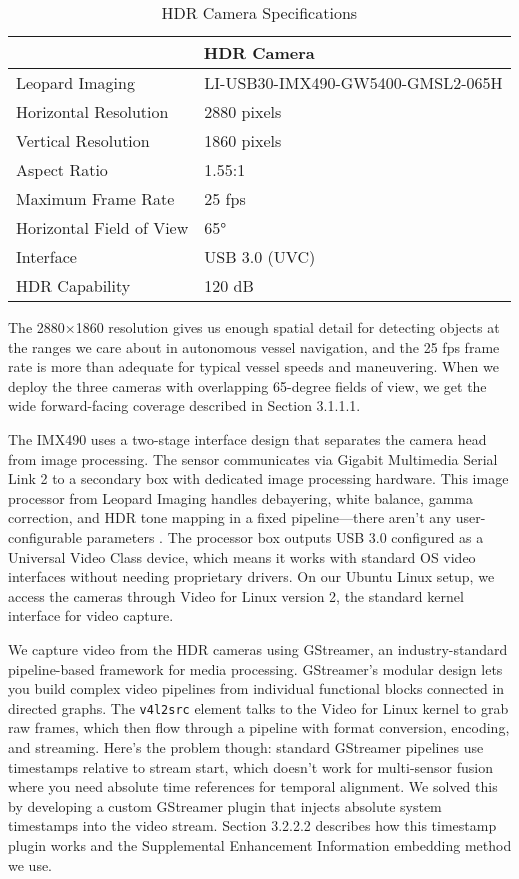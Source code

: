 \documentclass{erauthesis}
\begin{document}
\begin{table}[h]
\centering
\caption{HDR Camera Specifications}
\begin{tabular}{ll}
\hline
\multicolumn{2}{c}{HDR Camera}\\
\hline
\hline
Leopard Imaging & LI-USB30-IMX490-GW5400-GMSL2-065H \\
Horizontal Resolution & 2880 pixels \\
Vertical Resolution & 1860 pixels \\
Aspect Ratio & 1.55:1 \\
Maximum Frame Rate & 25 fps \\
Horizontal Field of View & 65° \\
Interface & USB 3.0 (UVC) \\
HDR Capability & 120 dB \\
\hline
\end{tabular}
\label{tab:hdr_camera_specs}
\end{table}

The 2880×1860 resolution gives us enough spatial detail for detecting objects at the ranges we care about in autonomous vessel navigation, and the 25 fps frame rate is more than adequate for typical vessel speeds and maneuvering.
When we deploy the three cameras with overlapping 65-degree fields of view, we get the wide forward-facing coverage described in Section 3.1.1.1.

The IMX490 uses a two-stage interface design that separates the camera head from image processing.
The sensor communicates via Gigabit Multimedia Serial Link 2 to a secondary box with dedicated image processing hardware.
This image processor from Leopard Imaging handles debayering, white balance, gamma correction, and \ac{HDR} tone mapping in a fixed pipeline—there aren't any user-configurable parameters \cite{thompson2023}.
The processor box outputs USB 3.0 configured as a Universal Video Class device, which means it works with standard OS video interfaces without needing proprietary drivers.
On our Ubuntu Linux setup, we access the cameras through Video for Linux version 2, the standard kernel interface for video capture.

We capture video from the \ac{HDR} cameras using GStreamer, an industry-standard pipeline-based framework for media processing.
GStreamer's modular design lets you build complex video pipelines from individual functional blocks connected in directed graphs.
The \texttt{v4l2src} element talks to the Video for Linux kernel to grab raw frames, which then flow through a pipeline with format conversion, encoding, and streaming.
Here's the problem though: standard GStreamer pipelines use timestamps relative to stream start, which doesn't work for multi-sensor fusion where you need absolute time references for temporal alignment.
We solved this by developing a custom GStreamer plugin that injects absolute system timestamps into the video stream.
Section 3.2.2.2 describes how this timestamp plugin works and the Supplemental Enhancement Information embedding method we use.
\end{document}
